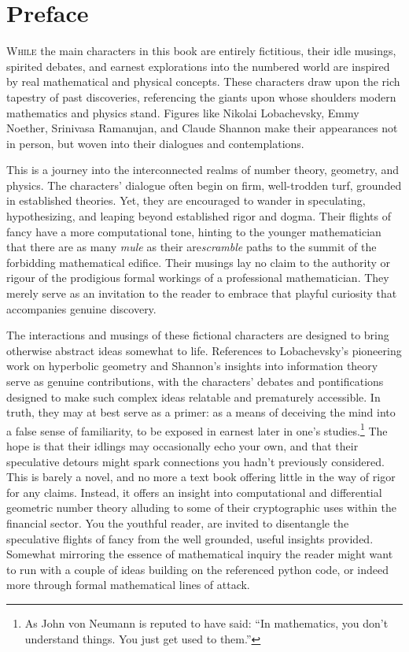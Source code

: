 \chapter*{Preface}

\vspace{\baselineskip}
\lettrine{W}{hile} the main characters in this book are entirely fictitious, their idle musings, spirited debates, and earnest explorations into the numbered world are inspired by real mathematical and physical concepts. These characters draw upon the rich tapestry of past discoveries, referencing the giants upon whose shoulders modern mathematics and physics stand. Figures like Nikolai Lobachevsky, Emmy Noether, Srinivasa Ramanujan, and Claude Shannon make their appearances not in person, but woven into their dialogues and contemplations.

This is a journey into the interconnected realms of number theory, geometry, and physics. The characters' dialogue often begin on firm, well-trodden turf, grounded in established theories. Yet, they are encouraged to wander in speculating, hypothesizing, and leaping beyond established rigor and dogma. Their flights of fancy have a more computational tone, hinting to the younger mathematician that there are as many \textit{mule} as their are\textit{scramble} paths to the summit of the forbidding mathematical edifice. Their musings lay no claim to the authority or rigour of the prodigious formal workings of a professional mathematician. They merely serve as an invitation to the reader to embrace that playful curiosity that accompanies genuine discovery.

The interactions and musings of these fictional characters are designed to bring otherwise abstract ideas somewhat to life. References to Lobachevsky’s pioneering work on hyperbolic geometry and Shannon’s insights into information theory serve as genuine contributions, with the characters’ debates and pontifications designed to make such complex ideas relatable and prematurely accessible. In truth, they may at best serve as a primer: as a means of deceiving the mind into a false sense of familiarity, to be exposed in earnest later in one’s studies.\footnote{As John von Neumann is reputed to have said: “In mathematics, you don’t understand things. You just get used to them.”} The hope is that their idlings may occasionally echo your own, and that their speculative detours might spark connections you hadn’t previously considered. This is barely a novel, and no more a text book offering little in the way of rigor for any claims. Instead, it offers an insight into computational and differential geometric number theory alluding to some of their cryptographic uses within the financial sector. You the youthful reader, are invited to disentangle the speculative flights of fancy from the well grounded, useful insights provided. Somewhat mirroring the essence of mathematical inquiry the reader might want to run with a couple of ideas building on the referenced python code, or indeed more through formal mathematical lines of attack.

